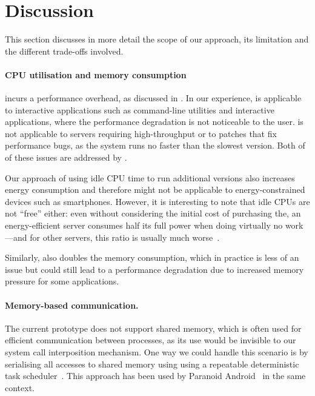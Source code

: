 \section{Discussion}
\label{safe-updates:discussion}

This section discusses in more detail the scope of our approach, its limitation
and the different trade-offs involved.


\paragraph{CPU utilisation and memory consumption} \mx incurs a performance
overhead, as discussed in . In our experience, \mx is
applicable to interactive applications such as command-line utilities and
interactive applications, where the performance degradation is not noticeable
to the user. \mx is not applicable to servers requiring high-throughput or to
patches that fix performance bugs, as the system runs no faster than the
slowest version.  Both of of these issues are addressed by
\varan.

Our approach of using idle CPU time to run additional versions also increases
energy consumption and therefore might not be applicable to energy-constrained
devices such as smartphones. However, it is interesting to note that idle CPUs
are not ``free'' either: even without considering the initial cost of
purchasing the, an energy-efficient server consumes half its full power when
doing virtually no work---and for other servers, this ratio is usually much
worse~\cite{barroso2007}.

Similarly, \mx also doubles the memory consumption, which in practice is less
of an issue but could still lead to a performance degradation due to increased
memory pressure for some applications.

\paragraph{Memory-based communication.} The current \mx prototype does not
support shared memory, which is often used for efficient communication between
processes, as its use would be invisible to our system call interposition
mechanism. One way we could handle this scenario is by serialising all accesses
to shared memory using using a repeatable deterministic task
scheduler~\cite{russinovich:pldi96}. This approach has been used by Paranoid
Android~\cite{paranoid-android} in the same context.

